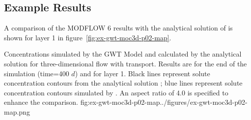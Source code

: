 

\subsection{Example Results}

A comparison of the MODFLOW 6 results with the analytical solution of \cite{wexler1992} is shown for layer 1 in figure~\ref{fig:ex-gwt-moc3d-p02-map}.

\begin{StandardFigure}{
                                     Concentrations simulated by the \mf GWT Model and calculated by the analytical solution for three-dimensional flow with transport.  Results are for the end of the simulation (time=400 $d$) and for layer 1.  Black lines represent solute concentration contours from the analytical solution \citep{wexler1992}; blue lines represent solute concentration contours simulated by \mf.  An aspect ratio of 4.0 is specified to enhance the comparison.
                                     }{fig:ex-gwt-moc3d-p02-map}{../figures/ex-gwt-moc3d-p02-map.png}
\end{StandardFigure}            

                
